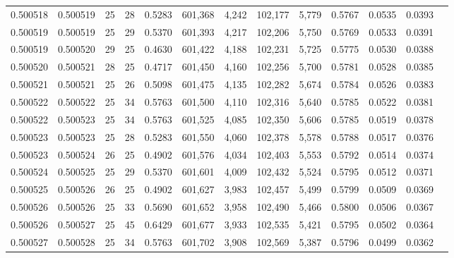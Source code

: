 \begin{tabular}{rrrrrrrrrrrrr}
0.500518 & 0.500519 &    25 &  28 &                                     0.5283 & 601,368 &   4,242 & 102,177 &   5,779 & 0.5767 & 0.0535 & 0.0393 \\
0.500519 & 0.500519 &    25 &  29 &                                     0.5370 & 601,393 &   4,217 & 102,206 &   5,750 & 0.5769 & 0.0533 & 0.0391 \\
0.500519 & 0.500520 &    29 &  25 &                                     0.4630 & 601,422 &   4,188 & 102,231 &   5,725 & 0.5775 & 0.0530 & 0.0388 \\
0.500520 & 0.500521 &    28 &  25 &                                     0.4717 & 601,450 &   4,160 & 102,256 &   5,700 & 0.5781 & 0.0528 & 0.0385 \\
0.500521 & 0.500521 &    25 &  26 &                                     0.5098 & 601,475 &   4,135 & 102,282 &   5,674 & 0.5784 & 0.0526 & 0.0383 \\
0.500522 & 0.500522 &    25 &  34 &                                     0.5763 & 601,500 &   4,110 & 102,316 &   5,640 & 0.5785 & 0.0522 & 0.0381 \\
0.500522 & 0.500523 &    25 &  34 &                                     0.5763 & 601,525 &   4,085 & 102,350 &   5,606 & 0.5785 & 0.0519 & 0.0378 \\
0.500523 & 0.500523 &    25 &  28 &                                     0.5283 & 601,550 &   4,060 & 102,378 &   5,578 & 0.5788 & 0.0517 & 0.0376 \\
0.500523 & 0.500524 &    26 &  25 &                                     0.4902 & 601,576 &   4,034 & 102,403 &   5,553 & 0.5792 & 0.0514 & 0.0374 \\
0.500524 & 0.500525 &    25 &  29 &                                     0.5370 & 601,601 &   4,009 & 102,432 &   5,524 & 0.5795 & 0.0512 & 0.0371 \\
0.500525 & 0.500526 &    26 &  25 &                                     0.4902 & 601,627 &   3,983 & 102,457 &   5,499 & 0.5799 & 0.0509 & 0.0369 \\
0.500526 & 0.500526 &    25 &  33 &                                     0.5690 & 601,652 &   3,958 & 102,490 &   5,466 & 0.5800 & 0.0506 & 0.0367 \\
0.500526 & 0.500527 &    25 &  45 &                                     0.6429 & 601,677 &   3,933 & 102,535 &   5,421 & 0.5795 & 0.0502 & 0.0364 \\
0.500527 & 0.500528 &    25 &  34 &                                     0.5763 & 601,702 &   3,908 & 102,569 &   5,387 & 0.5796 & 0.0499 & 0.0362 \\

\end{tabular}
